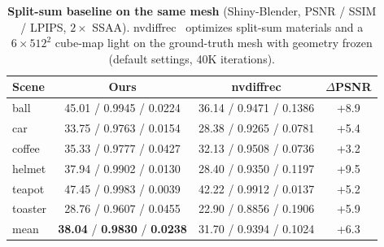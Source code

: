 
\begin{table}[t]
\color{addcolor}
\centering
\footnotesize
\caption{\textbf{Split-sum baseline on the same mesh} (Shiny-Blender, PSNR / SSIM / LPIPS, $2\times$
SSAA). nvdiffrec~\citep{nvdiffrec} optimizes split-sum materials and a $6{\times}512^2$ cube-map
light on the ground-truth mesh with geometry frozen (default settings, 40K iterations).}
\label{tab:nvdiffrec}
\begin{tabular}{@{}lccc@{}}
\toprule
Scene & Ours & nvdiffrec & $\Delta$PSNR \\
\midrule
ball    & 45.01 / 0.9945 / 0.0224 & 36.14 / 0.9471 / 0.1386 & +8.9 \\
car     & 33.75 / 0.9763 / 0.0154 & 28.38 / 0.9265 / 0.0781 & +5.4 \\
coffee  & 35.33 / 0.9777 / 0.0427 & 32.13 / 0.9508 / 0.0736 & +3.2 \\
helmet  & 37.94 / 0.9902 / 0.0130 & 28.40 / 0.9350 / 0.1197 & +9.5 \\
teapot  & 47.45 / 0.9983 / 0.0039 & 42.22 / 0.9912 / 0.0137 & +5.2 \\
toaster & 28.76 / 0.9607 / 0.0455 & 22.90 / 0.8856 / 0.1906 & +5.9 \\
\midrule
mean    & \textbf{38.04} / \textbf{0.9830} / \textbf{0.0238} & 31.70 / 0.9394 / 0.1024 & +6.3 \\
\bottomrule
\end{tabular}
\end{table}

